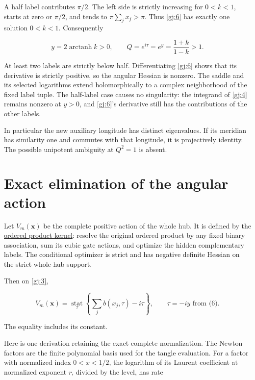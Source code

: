 A half label contributes \(\pi/2\). The left side is strictly increasing for \(0<k<1\), starts at zero or \(\pi/2\), and tends to \(\pi\sum_jx_j>\pi\). Thus \eqref{gj:6} has exactly one solution \(0<k<1\). Consequently

\begin{equation}\label{gj:7}
y=2\operatorname{arctanh}k>0,\qquad
 Q=e^{i\tau}=e^y=\frac{1+k}{1-k}>1.
\end{equation}

At least two labels are strictly below half. Differentiating \eqref{gj:6} shows that its derivative is strictly positive, so the angular Hessian is nonzero. The saddle and its selected logarithms extend holomorphically to a complex neighborhood of the fixed label tuple. The half-label case causes no singularity: the integrand of \eqref{gj:4} remains nonzero at \(y>0\), and \eqref{gj:6}'s derivative still has the contributions of the other labels.

In particular the new auxiliary longitude has distinct eigenvalues. If its meridian has similarity one and commutes with that longitude, it is projectively identity. The possible unipotent ambiguity at \(Q^2=1\) is absent.

\section{Exact elimination of the angular action}\label{gj:exact-elimination-of-the-angular-action}

Let \(V_m(\mathbf x)\) be the complete positive action of the whole hub.
It is defined by the \href{https://sashakolpakov.github.io/murakamis_dream/notes/actual_main_meridian_component_pressure.html\#complete-actions-boundary-variables-and-product-junctions}{ordered product kernel}: resolve the original ordered product by any fixed binary association, sum its cubic gate actions, and optimize the hidden complementary labels. The conditional optimizer is strict and has negative definite Hessian on the strict whole-hub support.

Then on \eqref{gj:3},

\begin{equation}\label{gj:8}
V_m(\mathbf x)=
 \underset{\tau}{\operatorname{stat}}
       \left\{\sum_jb(x_j,\tau)-i\tau\right\},
 \qquad \tau=-iy \text{ from (6)}.
\end{equation}

The equality includes its constant.

Here is one derivation retaining the exact complete normalization. The Newton factors are the finite polynomial basis used for the
tangle evaluation. For a factor with normalized index \(0<x<1/2\),
the logarithm of its Laurent coefficient at normalized exponent \(r\),
divided by the level, has rate

